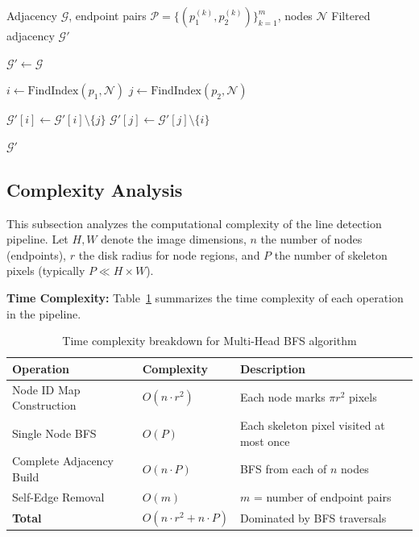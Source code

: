 \begin{algorithm}[H]
\caption{Remove Self-Edges (Same-Object Connections)}
\label{alg:remove_self}
\begin{algorithmic}[1]
\Require Adjacency $\mathcal{G}$, endpoint pairs $\mathcal{P} = \{(p_1^{(k)}, p_2^{(k)})\}_{k=1}^{m}$, nodes $\mathcal{N}$
\Ensure Filtered adjacency $\mathcal{G}'$

\State $\mathcal{G}' \gets \mathcal{G}$

    \State $i \gets \text{FindIndex}(p_1, \mathcal{N})$
    \State $j \gets \text{FindIndex}(p_2, \mathcal{N})$
    
        \State $\mathcal{G}'[i] \gets \mathcal{G}'[i] \setminus \{j\}$
        \State $\mathcal{G}'[j] \gets \mathcal{G}'[j] \setminus \{i\}$
    \EndIf
\EndFor

\State \Return $\mathcal{G}'$
\end{algorithmic}
\end{algorithm}

\subsection{Complexity Analysis}

This subsection analyzes the computational complexity of the line detection pipeline. Let $H, W$ denote the image dimensions, $n$ the number of nodes (endpoints), $r$ the disk radius for node regions, and $P$ the number of skeleton pixels (typically $P \ll H \times W$).

\textbf{Time Complexity:} Table~\ref{tab:time_complexity} summarizes the time complexity of each operation in the pipeline.

\begin{table}[H]
\centering
\begin{tabular}{@{}lll@{}}
\toprule
\textbf{Operation} & \textbf{Complexity} & \textbf{Description} \\
\midrule
Node ID Map Construction & $O(n \cdot r^2)$ & Each node marks $\pi r^2$ pixels \\
Single Node BFS & $O(P)$ & Each skeleton pixel visited at most once \\
Complete Adjacency Build & $O(n \cdot P)$ & BFS from each of $n$ nodes \\
Self-Edge Removal & $O(m)$ & $m$ = number of endpoint pairs \\
\midrule
\textbf{Total} & $O(n \cdot r^2 + n \cdot P)$ & Dominated by BFS traversals \\
\bottomrule
\end{tabular}
\caption{Time complexity breakdown for Multi-Head BFS algorithm}
\label{tab:time_complexity}
\end{table}

